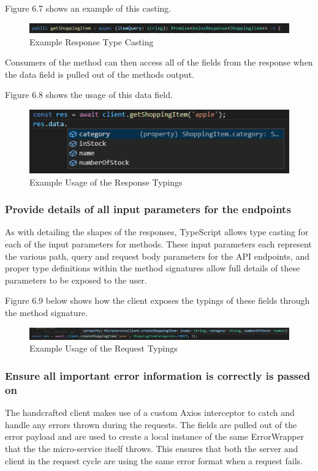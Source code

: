 Figure 6.7 shows an example of this casting.
\begin{figure}[!htb]
    \caption{Example Response Type Casting}
\centering
\includegraphics[scale=0.6]{FYP_Dissertation_template/Figures/handcrafted-client-response-type-casting.PNG}
\end{figure}
\FloatBarrier

Consumers of the method can then access all of the fields from the response when the data field is pulled out of the methods output.

Figure 6.8 shows the usage of this data field.
\begin{figure}[!htb]
    \caption{Example Usage of the Response Typings}
\centering
\includegraphics[scale=0.6]{FYP_Dissertation_template/Figures/handcrafted-client-response-type-return.PNG}
\end{figure}
\FloatBarrier
\subsubsection{Provide details of all input parameters for the endpoints}
As with detailing the shapes of the responses, TypeScript allows type casting for each of the input parameters for methods. These input parameters each represent the various path, query and request body parameters for the API endpoints, and proper type definitions within the method signatures allow full details of these parameters to be exposed to the user.

Figure 6.9 below shows how the client exposes the typings of these fields through the method signature.
\begin{figure}[!htb]
    \caption{Example Usage of the Request Typings}
\centering
\includegraphics[scale=0.57]{FYP_Dissertation_template/Figures/handcrafted-client-request-typings.PNG}
\end{figure}
\FloatBarrier
\subsubsection{Ensure all important error information is correctly is passed on}
The handcrafted client makes use of a custom Axios interceptor to catch and handle any errors thrown during the requests. The fields are pulled out of the error payload and are used to create a local instance of the same ErrorWrapper that the the micro-service itself throws. This ensures that both the server and client in the request cycle are using the same error format when a request fails.

